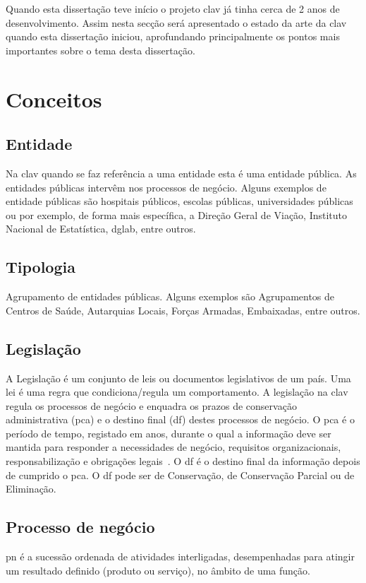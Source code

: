 Quando esta dissertação teve início o projeto \acrshort{clav} já tinha cerca de 2 anos de desenvolvimento. Assim nesta secção será apresentado o estado da arte da \acrshort{clav} quando esta dissertação iniciou, aprofundando principalmente os pontos mais importantes sobre o tema desta dissertação.

\section{Conceitos}

\subsection{Entidade}
Na \acrshort{clav} quando se faz referência a uma entidade esta é uma entidade pública. As entidades públicas intervêm nos processos de negócio. Alguns exemplos de entidade públicas são hospitais públicos, escolas públicas, universidades públicas ou por exemplo, de forma mais específica, a Direção Geral de Viação, Instituto Nacional de Estatística, \acrlong{dglab}, entre outros.

\subsection{Tipologia}
Agrupamento de entidades públicas. Alguns exemplos são Agrupamentos de Centros de Saúde, Autarquias Locais, Forças Armadas, Embaixadas, entre outros.

\subsection{Legislação}
A Legislação é um conjunto de leis ou documentos legislativos de um país. Uma lei é uma regra que condiciona/regula um comportamento. A legislação na \acrshort{clav} regula os processos de negócio e enquadra os prazos de conservação administrativa (\acrshort{pca}) e o destino final (\acrshort{df}) destes processos de negócio. O \acrshort{pca} é o período de tempo, registado em anos, durante o qual a informação deve ser mantida para responder a necessidades  de  negócio,  requisitos  organizacionais,  responsabilização  e obrigações legais~\cite{pca}. O \acrshort{df} é o destino final da informação depois de cumprido o \acrshort{pca}. O \acrshort{df} pode ser de Conservação, de Conservação Parcial ou de Eliminação.

\subsection{Processo de negócio}
\acrfull{pn} é a sucessão ordenada de atividades interligadas, desempenhadas para atingir um resultado definido (produto ou serviço), no âmbito de uma função.~\cite{procNeg}

